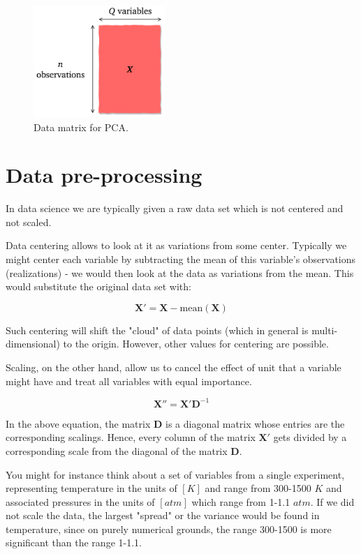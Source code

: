 \documentclass[10pt,twocolumn]{article}
\begin{document}
\begin{figure}[H]
\centering\includegraphics[width=5cm]{data-set-PCA.png}
\caption{Data matrix for PCA.}
\label{fig:data-matrix}
\end{figure}



\section{Data pre-processing}

In data science we are typically given a raw data set which is not centered and not scaled. 

Data centering allows to look at it as variations from some center. Typically we might center each variable by subtracting the mean of this variable's observations (realizations) - we would then look at the data as variations from the mean. This would substitute the original data set with:

\begin{equation}
\bm{X'} = \bm{X} - \text{mean}(\bm{X})
\end{equation}

Such centering will shift the "cloud" of data points (which in general is multi-dimensional) to the origin. However, other values for centering are possible.

Scaling, on the other hand, allow us to cancel the effect of unit that a variable might have and treat all variables with equal importance. 

\begin{equation}
\bm{X''} = \bm{X'}\bm{D}^{-1}
\end{equation}

In the above equation, the matrix $\bm{D}$ is a diagonal matrix whose entries are the corresponding scalings. Hence, every column of the matrix $\bm{X'}$ gets divided by a corresponding scale from the diagonal of the matrix $\bm{D}$.

You might for instance think about a set of variables from a single experiment, representing temperature in the units of $[K]$ and range from 300-1500 $K$ and associated pressures in the units of $[atm]$ which range from 1-1.1 $atm$. If we did not scale the data, the largest "spread" or the variance would be found in temperature, since on purely numerical  grounds, the range 300-1500 is more significant than the range 1-1.1.
\end{document}
